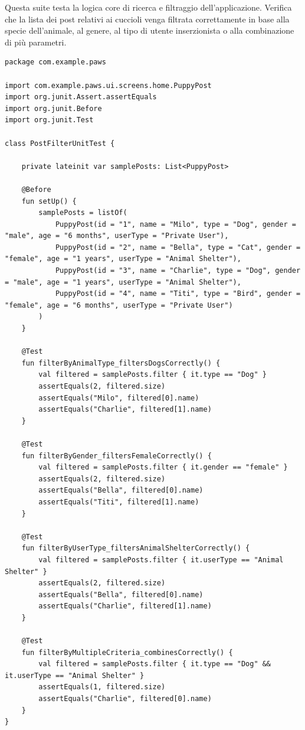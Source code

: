 \documentclass[a4paper]{report}
\begin{document}
Questa suite testa la logica core di ricerca e filtraggio dell'applicazione. Verifica che la lista dei post relativi ai cuccioli venga filtrata correttamente in base alla specie dell'animale, al genere, al tipo di utente inserzionista o alla combinazione di più parametri.
\begin{scriptsize}
\estiloKotlin
\begin{lstlisting}[caption={Unit Test per la logica di filtraggio dei post cuccioli}, label={lst:filter_test}]
package com.example.paws

import com.example.paws.ui.screens.home.PuppyPost
import org.junit.Assert.assertEquals
import org.junit.Before
import org.junit.Test

class PostFilterUnitTest {

    private lateinit var samplePosts: List<PuppyPost>

    @Before
    fun setUp() {
        samplePosts = listOf(
            PuppyPost(id = "1", name = "Milo", type = "Dog", gender = "male", age = "6 months", userType = "Private User"),
            PuppyPost(id = "2", name = "Bella", type = "Cat", gender = "female", age = "1 years", userType = "Animal Shelter"),
            PuppyPost(id = "3", name = "Charlie", type = "Dog", gender = "male", age = "1 years", userType = "Animal Shelter"),
            PuppyPost(id = "4", name = "Titi", type = "Bird", gender = "female", age = "6 months", userType = "Private User")
        )
    }

    @Test
    fun filterByAnimalType_filtersDogsCorrectly() {
        val filtered = samplePosts.filter { it.type == "Dog" }
        assertEquals(2, filtered.size)
        assertEquals("Milo", filtered[0].name)
        assertEquals("Charlie", filtered[1].name)
    }

    @Test
    fun filterByGender_filtersFemaleCorrectly() {
        val filtered = samplePosts.filter { it.gender == "female" }
        assertEquals(2, filtered.size)
        assertEquals("Bella", filtered[0].name)
        assertEquals("Titi", filtered[1].name)
    }

    @Test
    fun filterByUserType_filtersAnimalShelterCorrectly() {
        val filtered = samplePosts.filter { it.userType == "Animal Shelter" }
        assertEquals(2, filtered.size)
        assertEquals("Bella", filtered[0].name)
        assertEquals("Charlie", filtered[1].name)
    }

    @Test
    fun filterByMultipleCriteria_combinesCorrectly() {
        val filtered = samplePosts.filter { it.type == "Dog" && it.userType == "Animal Shelter" }
        assertEquals(1, filtered.size)
        assertEquals("Charlie", filtered[0].name)
    }
}
\end{lstlisting}
\end{scriptsize}
\end{document}
